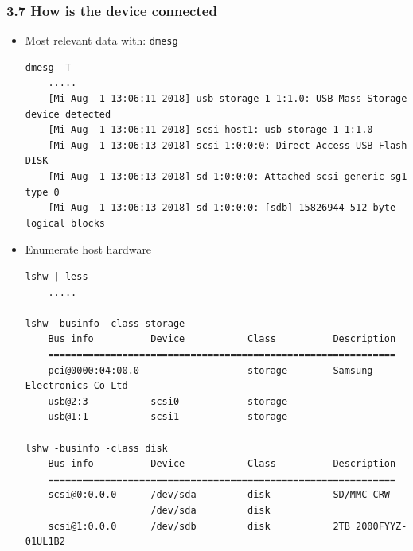 \begin{frame}[fragile]
  \frametitle{3.7 How is the device connected}
    \begin{itemize}
        \item Most relevant data with: \texttt{dmesg}
\begin{lstlisting}[basicstyle=\tiny]
dmesg -T
    .....
    [Mi Aug  1 13:06:11 2018] usb-storage 1-1:1.0: USB Mass Storage device detected
    [Mi Aug  1 13:06:11 2018] scsi host1: usb-storage 1-1:1.0
    [Mi Aug  1 13:06:13 2018] scsi 1:0:0:0: Direct-Access USB Flash DISK
    [Mi Aug  1 13:06:13 2018] sd 1:0:0:0: Attached scsi generic sg1 type 0
    [Mi Aug  1 13:06:13 2018] sd 1:0:0:0: [sdb] 15826944 512-byte logical blocks
\end{lstlisting}
        \item Enumerate host hardware
\begin{lstlisting}[basicstyle=\tiny]
lshw | less
    .....

lshw -businfo -class storage
    Bus info          Device           Class          Description
    =============================================================
    pci@0000:04:00.0                   storage        Samsung Electronics Co Ltd
    usb@2:3           scsi0            storage        
    usb@1:1           scsi1            storage

lshw -businfo -class disk
    Bus info          Device           Class          Description
    =============================================================
    scsi@0:0.0.0      /dev/sda         disk           SD/MMC CRW
                      /dev/sda         disk
    scsi@1:0.0.0      /dev/sdb         disk           2TB 2000FYYZ-01UL1B2
\end{lstlisting}
    \end{itemize}
\end{frame}


